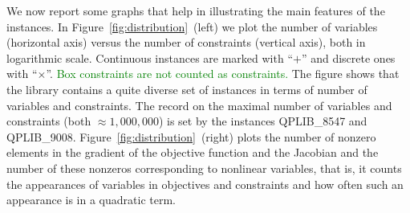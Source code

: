 
We now report some graphs that help in illustrating the main features
of the instances. In Figure~\ref{fig:distribution}~(left) we plot the number
of variables (horizontal axis) versus the number of constraints
(vertical axis), both in logarithmic scale. Continuous instances are
marked with ``$+$'' and discrete ones with ``$\times$''.
\textcolor{green}{Box constraints are not counted as constraints.} 
The figure shows
that the library contains a quite diverse set of instances in
terms of number of variables and constraints. {The record on the maximal number of variables and constraints (both $\approx 1,000,000$) is set by the instances QPLIB\_8547 and QPLIB\_9008.}
Figure~\ref{fig:distribution}~(right) plots the number of nonzero elements in the gradient of the objective function and the Jacobian and the number of these nonzeros corresponding to nonlinear variables, that is, it counts the appearances of variables in objectives and constraints and how often such an appearance is in a quadratic term.



